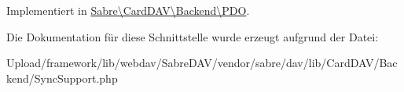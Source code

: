 Implementiert in \mbox{\hyperlink{class_sabre_1_1_card_d_a_v_1_1_backend_1_1_p_d_o_a6a70f8be9de0b90321638e8d57a9ab65}{Sabre\textbackslash{}\+Card\+D\+A\+V\textbackslash{}\+Backend\textbackslash{}\+P\+DO}}.



Die Dokumentation für diese Schnittstelle wurde erzeugt aufgrund der Datei\+:\begin{DoxyCompactItemize}
\item 
Upload/framework/lib/webdav/\+Sabre\+D\+A\+V/vendor/sabre/dav/lib/\+Card\+D\+A\+V/\+Backend/Sync\+Support.\+php\end{DoxyCompactItemize}
